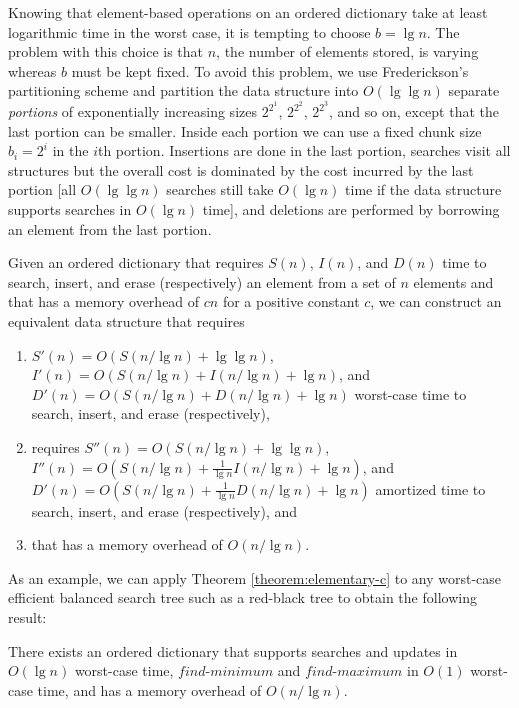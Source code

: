 \documentclass{DIKU-article}
\newcommand{\Findmin}{\mbox{$\mathit{find}$\textnormal{-}}\allowbreak{}\mbox{$\mathit{minimum}$}}
\newcommand{\Findmax}{\mbox{$\mathit{find}$\textnormal{-}}\allowbreak{}\mbox{$\mathit{maximum}$}}
\begin{document}
Knowing that element-based operations on an ordered dictionary take at
least logarithmic time in the worst case, it is tempting to choose $b
= \lg n$.  The problem with this choice is that $n$, the number of
elements stored, is varying whereas $b$ must be kept fixed. To avoid
this problem, we use Frederickson's partitioning scheme \cite{Fre83}
and partition the data structure into $O(\lg\lg n)$ separate
\emph{portions} of exponentially increasing sizes $2^{2^{1}}$,
$2^{2^{2}}$, $2^{2^{3}}$, and so on, except that the last portion can
be smaller.  Inside each portion we can use a fixed chunk size
$b_i=2^i$ in the $i$th portion. Insertions are done in the last
portion, searches visit all structures but the overall cost is
dominated by the cost incurred by the last portion [all $O(\lg\lg n)$
searches still take $O(\lg n)$ time if the data structure supports
searches in $O(\lg n)$ time], and deletions are performed by borrowing
an element from the last portion. 

\begin{theorem}
\label{theorem:elementary-c}
Given an ordered dictionary that requires $S(n)$, $I(n)$, and $D(n)$
time to search, insert, and erase (respectively) an element from a
set of $n$ elements and that has a memory overhead of $cn$ for a
positive constant $c$, we can construct an equivalent data structure
that requires 
\begin{enumerate}
\item $S'(n)=O(S(n/\lg n)+\lg\lg n)$, $I'(n)=O(S(n/\lg n)+I(n/\lg n)+\lg n)$,
and $D'(n)=O(S(n/\lg n)+D(n/\lg n)+\lg n)$ worst-case time to search, insert,
and erase (respectively), 
\item requires $S''(n)=O(S(n/\lg n)+\lg\lg n)$,
$I''(n)=O(S(n/\lg n)+\frac{1}{\lg n}I(n/\lg n)+\lg n)$, and
$D'(n)=O(S(n/\lg n)+\frac{1}{\lg n}D(n/\lg n)+\lg n)$ amortized time to search,
insert, and erase (respectively), and 
\item that has a memory overhead of
$O(n/\lg n)$.
\end{enumerate}
\end{theorem}

As an example, we can apply Theorem \ref{theorem:elementary-c} to any
worst-case efficient balanced search tree such as a red-black tree to
obtain the following result:

\begin{corollary}
\label{corollary:red-black}
There exists an ordered dictionary that supports searches and updates
in $O(\lg n)$ worst-case time, \Findmin{} and \Findmax{} in $O(1)$
worst-case time, and has a memory overhead of $O(n/\lg n)$.
\end{corollary}
\end{document}
